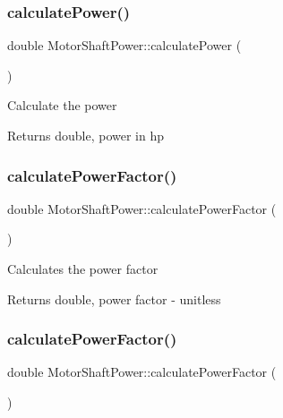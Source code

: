 \mbox{\label{class_motor_shaft_power_a4a2756922b290bec13550110aac25b8c}} 
\subsubsection{\texorpdfstring{calculate\+Power()}{calculatePower()}\hspace{0.1cm}{\footnotesize\ttfamily [3/3]}}
{\footnotesize\ttfamily double Motor\+Shaft\+Power\+::calculate\+Power (\begin{DoxyParamCaption}{ }\end{DoxyParamCaption})}

Calculate the power

\begin{DoxyReturn}{Returns}
double, power in hp 
\end{DoxyReturn}
\mbox{\label{class_motor_shaft_power_aa7e9eb3a219c86f0ee0fb5b3d733b60a}} 
\subsubsection{\texorpdfstring{calculate\+Power\+Factor()}{calculatePowerFactor()}\hspace{0.1cm}{\footnotesize\ttfamily [1/3]}}
{\footnotesize\ttfamily double Motor\+Shaft\+Power\+::calculate\+Power\+Factor (\begin{DoxyParamCaption}{ }\end{DoxyParamCaption})}

Calculates the power factor

\begin{DoxyReturn}{Returns}
double, power factor -\/ unitless 
\end{DoxyReturn}
\mbox{\label{class_motor_shaft_power_aa7e9eb3a219c86f0ee0fb5b3d733b60a}} 
\subsubsection{\texorpdfstring{calculate\+Power\+Factor()}{calculatePowerFactor()}\hspace{0.1cm}{\footnotesize\ttfamily [2/3]}}
{\footnotesize\ttfamily double Motor\+Shaft\+Power\+::calculate\+Power\+Factor (\begin{DoxyParamCaption}{ }\end{DoxyParamCaption})}


